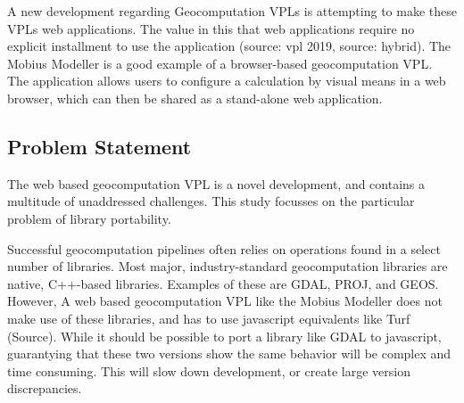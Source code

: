 A new development regarding Geocomputation VPLs is attempting to make these VPLs web applications.
The value in this that web applications require no explicit installment to use the application (source: vpl 2019, source: hybrid). 
The Mobius Modeller is a good example of a browser-based geocomputation VPL.
The application allows users to configure a calculation by visual means in a web browser, which can then be shared as a stand-alone web application. 




\subsection*{Problem Statement}
  
The web based geocomputation VPL is a novel development, and contains a multitude of unaddressed challenges.
This study focusses on the particular problem of library portability. %

Successful geocomputation pipelines often relies on operations found in a select number of libraries. 
Most major, industry-standard geocomputation libraries are native, C++-based libraries. 
Examples of these are GDAL, PROJ, and GEOS. 
However, A web based geocomputation VPL like the Mobius Modeller does not make use of these libraries, and has to use javascript equivalents like Turf (Source).
While it should be possible to port a library like GDAL to javascript, guarantying that these two versions show the same behavior will be complex and time consuming. This will slow down development, or create large version discrepancies. 

